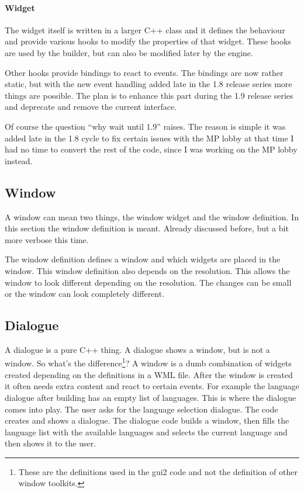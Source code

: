 \paragraph{Widget}
The widget itself is written in a larger C++ class and it defines the behaviour
and provide various hooks to modify the properties of that widget. These hooks
are used by the builder, but can also be modified later by the engine.

Other hooks provide bindings to react to events. The bindings are now rather
static, but with the new event handling added late in the 1.8 release series
more things are possible. The plan is to enhance this part during the 1.9
release series and deprecate and remove the current interface.

Of course the question ``why wait until 1.9'' raises. The reason is simple it
was added late in the 1.8 cycle to fix certain issues with the MP lobby at that
time I had no time to convert the rest of the code, since I was working on the
MP lobby instead.

\subsection{Window}

A window can mean two things, the window widget and the window definition. In
this section the window definition is meant. Already discussed before, but a bit
more verbose this time.

The window definition defines a window and which widgets are placed in the
window. This window definition also depends on the resolution. This allows the
window to look different depending on the resolution. The changes can be small
or the window can look completely different.

\subsection{Dialogue}

A dialogue is a pure C++ thing. A dialogue shows a window, but is not a window.
So what's the difference\footnote{These are the definitions used in the gui2
code and not the definition of other window toolkits.}? A window is a dumb
combination of widgets created depending on the definitions in a WML file. After
the window is created it often needs extra content and react to certain events.
For example the language dialogue after building has an empty list of languages.
This is where the dialogue comes into play. The user asks for the language
selection dialogue. The code creates and shows a dialogue. The dialogue code
builds a window, then fills the language list with the available languages and
selects the current language and then shows it to the user.

